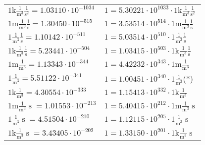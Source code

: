 \begin{center}
\begin{longtable}{l l}
{\color{gray}$1 \bm{\mathrm{ k}}\frac1{\operatorname{m}^3}\frac1{\operatorname{s}^2}{}{} = 1.03110\cdot10^{-1034} $}   & {\color{gray}$ 1 = 5.30221\cdot10^{1033} \cdot 1 \bm{\mathrm{ k}}\frac1{\operatorname{m}^3}\frac1{\operatorname{s}^2}{}{}$}  \\
{\color{gray}$1 \bm{\mathrm{ m}}\frac1{\operatorname{m}^3}\frac1{\operatorname{s}}{}{} = 1.30450\cdot10^{-515} $}   & {\color{gray}$ 1 = 3.53514\cdot10^{514} \cdot 1 \bm{\mathrm{ m}}\frac1{\operatorname{m}^3}\frac1{\operatorname{s}}{}{}$}  \\
{\color{black}$1 \bm{\mathrm{ }}\frac1{\operatorname{m}^3}\frac1{\operatorname{s}}{}{} = 1.10142\cdot10^{-511} $}   & {\color{black}$ 1 = 5.03514\cdot10^{510} \cdot 1 \bm{\mathrm{ }}\frac1{\operatorname{m}^3}\frac1{\operatorname{s}}{}{}$}  \\
{\color{gray}$1 \bm{\mathrm{ k}}\frac1{\operatorname{m}^3}\frac1{\operatorname{s}}{}{} = 5.23441\cdot10^{-504} $}   & {\color{gray}$ 1 = 1.03415\cdot10^{503} \cdot 1 \bm{\mathrm{ k}}\frac1{\operatorname{m}^3}\frac1{\operatorname{s}}{}{}$}  \\
{\color{gray}$1 \bm{\mathrm{ m}}\frac1{\operatorname{m}^3}{}{}{} = 1.13343\cdot10^{-344} $}   & {\color{gray}$ 1 = 4.42232\cdot10^{343} \cdot 1 \bm{\mathrm{ m}}\frac1{\operatorname{m}^3}{}{}{}$}  \\
{\color{black}$1 \bm{\mathrm{ }}\frac1{\operatorname{m}^3}{}{}{} = 5.51122\cdot10^{-341} $}   & {\color{black}$ 1 = 1.00451\cdot10^{340} \cdot 1 \bm{\mathrm{ }}\frac1{\operatorname{m}^3}{}{}{}$}\quad(*)\\
{\color{gray}$1 \bm{\mathrm{ k}}\frac1{\operatorname{m}^3}{}{}{} = 4.30554\cdot10^{-333} $}   & {\color{gray}$ 1 = 1.15413\cdot10^{332} \cdot 1 \bm{\mathrm{ k}}\frac1{\operatorname{m}^3}{}{}{}$}  \\
{\color{gray}$1 \bm{\mathrm{ m}}\frac1{\operatorname{m}^3}{\operatorname{s}}{}{} = 1.01553\cdot10^{-213} $}   & {\color{gray}$ 1 = 5.40415\cdot10^{212} \cdot 1 \bm{\mathrm{ m}}\frac1{\operatorname{m}^3}{\operatorname{s}}{}{}$}  \\
{\color{black}$1 \bm{\mathrm{ }}\frac1{\operatorname{m}^3}{\operatorname{s}}{}{} = 4.51504\cdot10^{-210} $}   & {\color{black}$ 1 = 1.12115\cdot10^{205} \cdot 1 \bm{\mathrm{ }}\frac1{\operatorname{m}^3}{\operatorname{s}}{}{}$}  \\
{\color{gray}$1 \bm{\mathrm{ k}}\frac1{\operatorname{m}^3}{\operatorname{s}}{}{} = 3.43405\cdot10^{-202} $}   & {\color{gray}$ 1 = 1.33150\cdot10^{201} \cdot 1 \bm{\mathrm{ k}}\frac1{\operatorname{m}^3}{\operatorname{s}}{}{}$}  \\

\end{longtable}
\end{center}
